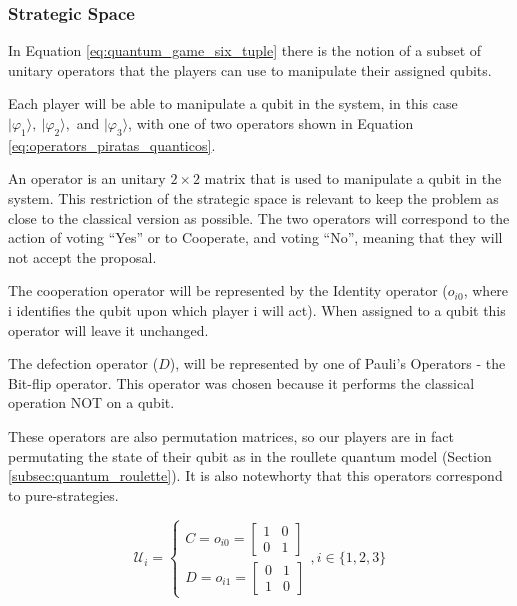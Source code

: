 \subsubsection{Strategic Space}
\label{subsec:strategic_space}

In Equation \ref{eq:quantum_game_six_tuple} there is the notion of a subset of unitary operators that the players can use to manipulate their assigned qubits. 

Each player will be able to manipulate a qubit in the system, in this case $\vert\varphi_{1}\rangle,\:\vert\varphi_{2}\rangle,$ and $\vert\varphi_{3}\rangle$, with one of two operators shown in Equation \ref{eq:operators_piratas_quanticos}. 

An operator is an unitary $2\times2$ matrix that is used to manipulate a qubit in the system.
This restriction of the strategic space is relevant to keep the problem as close to the classical version as possible. The two operators will correspond to the action of voting ``Yes'' or to Cooperate, and voting ``No'', meaning that they will not accept the proposal.  

The cooperation operator will be represented by the Identity operator ($o_{i0}$, where i identifies the qubit upon which player i will act). When assigned to a qubit this operator will leave it unchanged. 

The defection operator ($D$), will be represented by one of Pauli's Operators - the Bit-flip operator. This operator was chosen because it performs the classical operation NOT on a qubit.

These operators are also permutation matrices, so our players are in fact permutating the state of their qubit as in the roullete quantum model (Section \ref{subsec:quantum_roulette}). It is also notewhorty that this operators correspond to pure-strategies.

\begin{equation}
\label{eq:operators_piratas_quanticos}
\mathcal{U}_{i} = \begin{cases}
C = o_{i0}=\left[\begin{array}{cc}
1 & 0\\
0 & 1
\end{array}\right]\\
D = o_{i1}=\left[\begin{array}{cc}
0 & 1\\
1 & 0
\end{array}\right]
\end{cases} , i \in \{ 1, 2, 3 \}
\end{equation}

